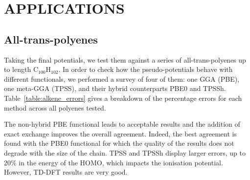 \documentclass[12pt]{article}
\begin{document}
\section*{\sffamily \large APPLICATIONS}

\subsection*{\sffamily \large All-trans-polyenes}

Taking the final potentials, we test them against a series of all-trans-polyenes up to length C\(_{100}\)H\(_{102}\).
In order to check how the pseudo-potentials behave with different functionals, we performed a survey of four of them: one GGA (PBE), one meta-GGA (TPSS), and their hybrid counterparts PBE0 and TPSSh.\cite{pbe0,pbe,tpss,tpssh}
Table~\ref{table:alkene_errors} gives a breakdown of the percentage errors for each method across
all polyenes tested.

The non-hybrid PBE functional leads to acceptable results and the addition of exact exchange improves the overall agreement.
Indeed, the best agreement is found with the PBE0 functional for which the quality of the results does not degrade with the size of the chain.
TPSS and TPSSh display larger errors, up to 20\% in the energy of the HOMO, which impacts the ionisation potential.
However, TD-DFT results are very good.
\end{document}
